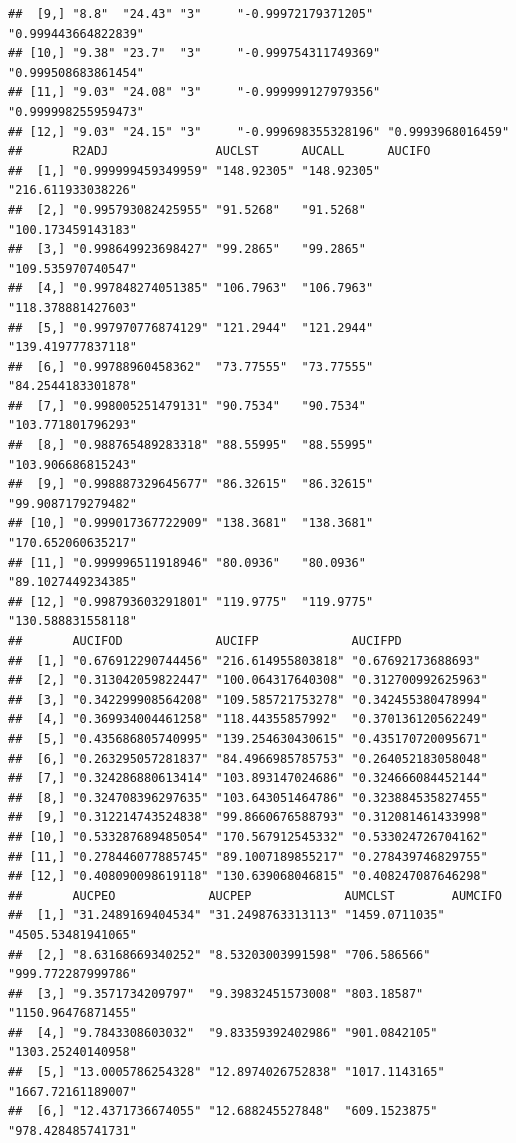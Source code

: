 \documentclass[
  10pt,
]{krantz}
\begin{document}
\begin{verbatim}
##  [9,] "8.8"  "24.43" "3"     "-0.99972179371205"  "0.999443664822839"
## [10,] "9.38" "23.7"  "3"     "-0.999754311749369" "0.999508683861454"
## [11,] "9.03" "24.08" "3"     "-0.999999127979356" "0.999998255959473"
## [12,] "9.03" "24.15" "3"     "-0.999698355328196" "0.9993968016459"  
##       R2ADJ               AUCLST      AUCALL      AUCIFO            
##  [1,] "0.999999459349959" "148.92305" "148.92305" "216.611933038226"
##  [2,] "0.995793082425955" "91.5268"   "91.5268"   "100.173459143183"
##  [3,] "0.998649923698427" "99.2865"   "99.2865"   "109.535970740547"
##  [4,] "0.997848274051385" "106.7963"  "106.7963"  "118.378881427603"
##  [5,] "0.997970776874129" "121.2944"  "121.2944"  "139.419777837118"
##  [6,] "0.99788960458362"  "73.77555"  "73.77555"  "84.2544183301878"
##  [7,] "0.998005251479131" "90.7534"   "90.7534"   "103.771801796293"
##  [8,] "0.988765489283318" "88.55995"  "88.55995"  "103.906686815243"
##  [9,] "0.998887329645677" "86.32615"  "86.32615"  "99.9087179279482"
## [10,] "0.999017367722909" "138.3681"  "138.3681"  "170.652060635217"
## [11,] "0.999996511918946" "80.0936"   "80.0936"   "89.1027449234385"
## [12,] "0.998793603291801" "119.9775"  "119.9775"  "130.588831558118"
##       AUCIFOD             AUCIFP             AUCIFPD            
##  [1,] "0.676912290744456" "216.614955803818" "0.67692173688693" 
##  [2,] "0.313042059822447" "100.064317640308" "0.312700992625963"
##  [3,] "0.342299908564208" "109.585721753278" "0.342455380478994"
##  [4,] "0.369934004461258" "118.44355857992"  "0.370136120562249"
##  [5,] "0.435686805740995" "139.254630430615" "0.435170720095671"
##  [6,] "0.263295057281837" "84.4966985785753" "0.264052183058048"
##  [7,] "0.324286880613414" "103.893147024686" "0.324666084452144"
##  [8,] "0.324708396297635" "103.643051464786" "0.323884535827455"
##  [9,] "0.312214743524838" "99.8660676588793" "0.312081461433998"
## [10,] "0.533287689485054" "170.567912545332" "0.533024726704162"
## [11,] "0.278446077885745" "89.1007189855217" "0.278439746829755"
## [12,] "0.408090098619118" "130.639068046815" "0.408247087646298"
##       AUCPEO             AUCPEP             AUMCLST        AUMCIFO           
##  [1,] "31.2489169404534" "31.2498763313113" "1459.0711035" "4505.53481941065"
##  [2,] "8.63168669340252" "8.53203003991598" "706.586566"   "999.772287999786"
##  [3,] "9.3571734209797"  "9.39832451573008" "803.18587"    "1150.96476871455"
##  [4,] "9.7843308603032"  "9.83359392402986" "901.0842105"  "1303.25240140958"
##  [5,] "13.0005786254328" "12.8974026752838" "1017.1143165" "1667.72161189007"
##  [6,] "12.4371736674055" "12.688245527848"  "609.1523875"  "978.428485741731"

\end{verbatim}
\end{document}
